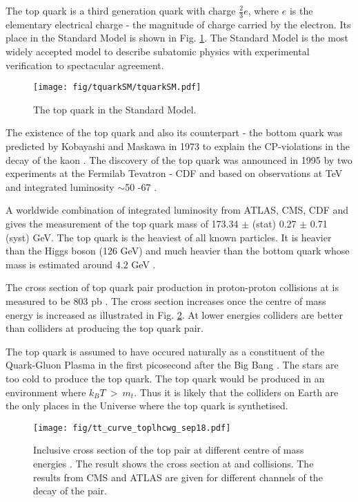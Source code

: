 The top quark is a third generation quark with charge $\frac{2}{3}e$, where $e$ is the elementary electrical charge - the magnitude of charge carried by the electron. Its place in the Standard Model is shown in Fig. \ref{fig:top_quarkSM}. The Standard Model is the most widely accepted model to describe subatomic physics with experimental verification to spectacular agreement.

  \begin{figure}[hbtp]

    \centering
    \texttt{[image: fig/tquarkSM/tquarkSM.pdf]}
    \caption{The top quark in the Standard Model.}
    \label{fig:top_quarkSM}
    
  \end{figure}

The existence of the top quark and also its counterpart - the bottom quark was predicted by Kobayashi and Maskawa in 1973 to explain the CP-violations in the decay of the kaon \cite{Kobayashi:1973fv}. The discovery of the top quark was announced in 1995 by two experiments at the Fermilab Tevatron - CDF \cite{Abe:1995hr} and \DZERO \cite{D0:1995jca} based on observations at  TeV and integrated luminosity $\sim$50 -67 \fbinv.

A worldwide combination of integrated luminosity from ATLAS, CMS, CDF and \DZERO gives the measurement of the top quark mass of 173.34 $\pm$ (stat) 0.27 $\pm$ 0.71 (syst) GeV. The top quark is the heaviest of all known particles. It is heavier than the Higgs boson (126 GeV) and much heavier than the bottom quark whose mass is estimated around $4.2$ GeV \cite{Hoang:1999ye}.

The cross section of top quark pair production in proton-proton collisions at  \TeV is measured to be 803 pb \cite{Sirunyan:2018goh}. The cross section increases once the centre of mass energy is increased as illustrated in Fig. \ref{fig:tt_curve_toplhcwg_sep18}. At lower energies \Pp\Pap colliders are better than \Pp\Pp colliders at producing the top quark pair.

The top quark is assumed to have occured naturally as a constituent of the Quark-Gluon Plasma in the first picosecond after the Big Bang \cite{Husdal:2016haj}. The stars are too cold to produce the top quark. The top quark would be produced in an environment where $k_{B}T\ >\ m_{t}$. Thus it is likely that the colliders on Earth are the only places in the Universe where the top quark is synthetised.

\begin{figure}[hbtp]

  \centering
  \texttt{[image: fig/tt\_curve\_toplhcwg\_sep18.pdf]}
  \caption{Inclusive cross section of the top pair at different centre of mass energies \cite{twiki:tt_curve_toplhcwg_sep18}. The result shows the cross section at \Pp\Pp and \Pp\Pap collisions. The results from CMS and ATLAS are given for different channels of the decay of the \ttbar pair.}
  \label{fig:tt_curve_toplhcwg_sep18}
  
\end{figure}


